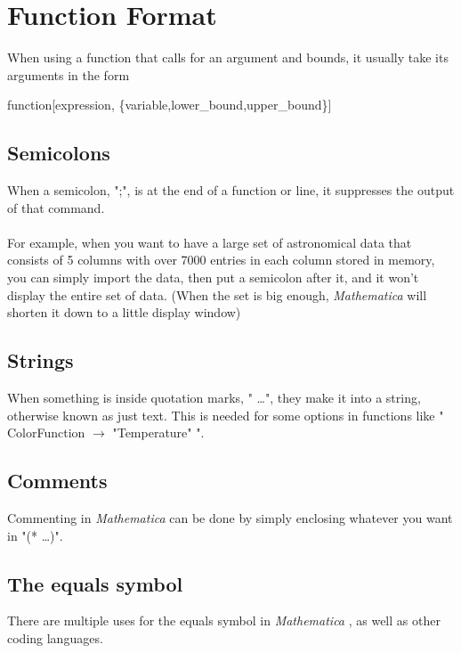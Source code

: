 \documentclass[11pt,letterpaper,twoside,titlepage]{report}
\newcommand{\Mathematica}{\textit{Mathematica} }
\begin{document}
		\chapter{Function Format}
			
			When using a function that calls for an argument and bounds, it usually take its arguments in the form
				
			\begin{center} function[expression, \{variable,lower\_bound,upper\_bound\}] \end{center}
			
			\section{Semicolons}
			
				When a semicolon, ";", is at the end of a function or line, it suppresses the output of that command.
				\\
				\\
				For example, when you want to have a large set of astronomical data that consists of 5 columns with over 7000 entries in each column stored in memory, you can simply import the data, then put a semicolon after it, and it won't display the entire set of data. (When the set is big enough, \Mathematica will shorten it down to a little display window)

			\section{Strings}
				
				When something is inside quotation marks, " \dots ", they make it into a string, otherwise known as just text.  This is needed for some options in functions like " ColorFunction $\rightarrow$ "Temperature" ".

			\section{Comments}
			
				Commenting in \Mathematica can be done by simply enclosing whatever you want in "(* \dots *)".

			\section{The equals symbol}
				
				There are multiple uses for the equals symbol in \Mathematica, as well as other coding languages.  
				
\end{document}
